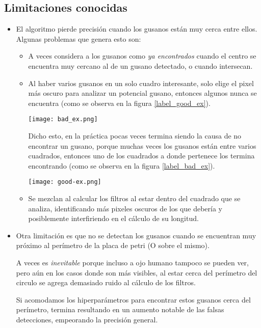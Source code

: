 \documentclass{article}
\begin{document}
\subsection{Limitaciones conocidas}
\begin{itemize}
\item El algoritmo pierde precisión cuando los gusanos están muy cerca entre ellos. Algunas problemas que genera esto son:
\begin{itemize}
\item A veces considera a los gusanos como \emph{ya encontrados} cuando el centro se encuentra muy cercano al de un gusano detectado, o cuando intersecan.

\item Al haber varios gusanos en un solo cuadro interesante, solo elige el pixel más oscuro para analizar un potencial gusano, entonces algunos nunca se encuentra (como se observa en la figura \ref{label_good_ex}).

\begin{figure*}[h]
    \centering
    \texttt{[image: bad\_ex.png]}
    \caption{Ejemplo donde se pierden gusanos por proximidad}
    \label{label_good_ex}
\end{figure*}

\hspace{0.2cm} Dicho esto, en la práctica pocas veces termina siendo la causa de no encontrar un gusano, porque muchas veces los gusanos están entre varios cuadrados, entonces uno de los cuadrados a donde pertenece los termina encontrando (como se observa en la figura \ref{label_bad_ex}).

\begin{figure*}[h]
    \centering
    \texttt{[image: good-ex.png]}
    \caption{Ejemplo donde \textbf{no} se pierden gusanos por proximidad}
    \label{label_bad_ex}
\end{figure*}

\item Se mezclan al calcular los filtros al estar dentro del cuadrado que se analiza, identificando más pixeles oscuros de los que debería y posiblemente interfiriendo en el cálculo de su longitud.
\end{itemize}

\item Otra limitación es que no se detectan los gusanos cuando se encuentran muy próximo al perímetro de la placa de petri (O sobre el mismo).

\hspace{0.2cm} A veces es \emph{inevitable} porque incluso a ojo humano tampoco se pueden ver, pero aún en los casos donde son más visibles, al estar cerca del perímetro del circulo se agrega demasiado ruido al cálculo de los filtros.

\hspace{0.2cm} Si acomodamos los hiperparámetros para encontrar estos gusanos cerca del perímetro, termina resultando en un aumento notable de las falsas detecciones, empeorando la precisión general.
\end{itemize}
\end{document}
